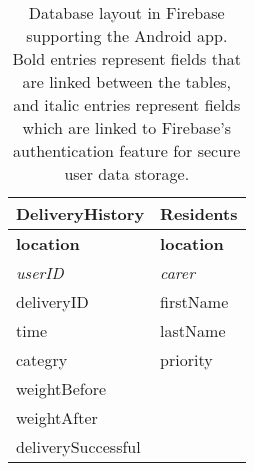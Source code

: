 \documentclass{article}
\begin{document}
\begin{table}[h]
  \begin{tabular}{|l|l|}
    \hline
    DeliveryHistory & Residents \\
    \hline
    {\bf location} & {\bf location} \\
    {\it userID} & {\it carer} \\
    deliveryID & firstName \\
    time & lastName \\
    categry & priority \\
    weightBefore & \\
    weightAfter &  \\
    deliverySuccessful & \\
    \hline
  \end{tabular}
  \caption{Database layout in Firebase supporting the Android app. Bold entries represent fields that are linked between the tables, and italic entries represent fields which are linked to Firebase's authentication feature for secure user data storage.}
  \label{tab:firebase}
\end{table}

\clearpage

\end{document}

